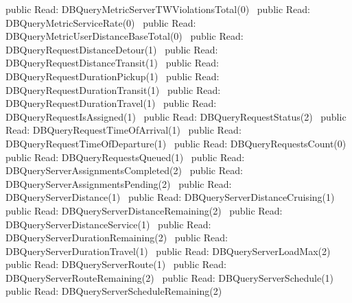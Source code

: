 public \LA{}Read: DBQueryMetricServerTWViolationsTotal(0)~{\nwtagstyle{}}\RA{}
public \LA{}Read: DBQueryMetricServiceRate(0)~{\nwtagstyle{}}\RA{}
public \LA{}Read: DBQueryMetricUserDistanceBaseTotal(0)~{\nwtagstyle{}}\RA{}
public \LA{}Read: DBQueryRequestDistanceDetour(1)~{\nwtagstyle{}}\RA{}
public \LA{}Read: DBQueryRequestDistanceTransit(1)~{\nwtagstyle{}}\RA{}
public \LA{}Read: DBQueryRequestDurationPickup(1)~{\nwtagstyle{}}\RA{}
public \LA{}Read: DBQueryRequestDurationTransit(1)~{\nwtagstyle{}}\RA{}
public \LA{}Read: DBQueryRequestDurationTravel(1)~{\nwtagstyle{}}\RA{}
public \LA{}Read: DBQueryRequestIsAssigned(1)~{\nwtagstyle{}}\RA{}
public \LA{}Read: DBQueryRequestStatus(2)~{\nwtagstyle{}}\RA{}
public \LA{}Read: DBQueryRequestTimeOfArrival(1)~{\nwtagstyle{}}\RA{}
public \LA{}Read: DBQueryRequestTimeOfDeparture(1)~{\nwtagstyle{}}\RA{}
public \LA{}Read: DBQueryRequestsCount(0)~{\nwtagstyle{}}\RA{}
public \LA{}Read: DBQueryRequestsQueued(1)~{\nwtagstyle{}}\RA{}
public \LA{}Read: DBQueryServerAssignmentsCompleted(2)~{\nwtagstyle{}}\RA{}
public \LA{}Read: DBQueryServerAssignmentsPending(2)~{\nwtagstyle{}}\RA{}
public \LA{}Read: DBQueryServerDistance(1)~{\nwtagstyle{}}\RA{}
public \LA{}Read: DBQueryServerDistanceCruising(1)~{\nwtagstyle{}}\RA{}
public \LA{}Read: DBQueryServerDistanceRemaining(2)~{\nwtagstyle{}}\RA{}
public \LA{}Read: DBQueryServerDistanceService(1)~{\nwtagstyle{}}\RA{}
public \LA{}Read: DBQueryServerDurationRemaining(2)~{\nwtagstyle{}}\RA{}
public \LA{}Read: DBQueryServerDurationTravel(1)~{\nwtagstyle{}}\RA{}
public \LA{}Read: DBQueryServerLoadMax(2)~{\nwtagstyle{}}\RA{}
public \LA{}Read: DBQueryServerRoute(1)~{\nwtagstyle{}}\RA{}
public \LA{}Read: DBQueryServerRouteRemaining(2)~{\nwtagstyle{}}\RA{}
public \LA{}Read: DBQueryServerSchedule(1)~{\nwtagstyle{}}\RA{}
public \LA{}Read: DBQueryServerScheduleRemaining(2)~{\nwtagstyle{}}\RA{}
